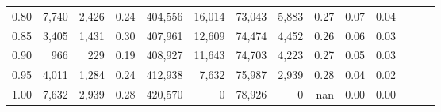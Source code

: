 \begin{tabular}{rrrrrrrrrrrrrr}
0.80 &   7,740 &   2,426 &  0.24 &  404,556 &   16,014 &  73,043 &   5,883 &  0.27 &  0.07 &      0.04 \\
0.85 &   3,405 &   1,431 &  0.30 &  407,961 &   12,609 &  74,474 &   4,452 &  0.26 &  0.06 &      0.03 \\
0.90 &     966 &     229 &  0.19 &  408,927 &   11,643 &  74,703 &   4,223 &  0.27 &  0.05 &      0.03 \\
0.95 &   4,011 &   1,284 &  0.24 &  412,938 &    7,632 &  75,987 &   2,939 &  0.28 &  0.04 &      0.02 \\
1.00 &   7,632 &   2,939 &  0.28 &  420,570 &        0 &  78,926 &       0 &   nan &  0.00 &      0.00 \\
\bottomrule
\end{tabular}
